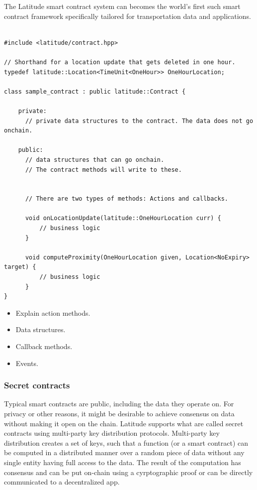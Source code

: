 The Latitude smart contract system can becomes the world's first such smart contract framework specifically tailored for
transportation data and applications.

\lstset{language=C++,basicstyle=\small}

\begin{lstlisting}[float, caption=Structure of a Latitude Smart Contract, frame=lines]

#include <latitude/contract.hpp>

// Shorthand for a location update that gets deleted in one hour.
typedef latitude::Location<TimeUnit<OneHour>> OneHourLocation;

class sample_contract : public latitude::Contract {

    private:
      // private data structures to the contract. The data does not go onchain.

    public:
      // data structures that can go onchain.
      // The contract methods will write to these.


      // There are two types of methods: Actions and callbacks.

      void onLocationUpdate(latitude::OneHourLocation curr) {
          // business logic
      }

      void computeProximity(OneHourLocation given, Location<NoExpiry> target) {
          // business logic
      }
}
\end{lstlisting}

\begin{itemize}

    \item Explain action methods.
    \item Data structures.
    \item Callback methods.
    \item Events.

\end{itemize}

\subsubsection{Secret contracts}

Typical smart contracts are public, including the data they operate on. For privacy or other reasons, it might be
desirable to achieve consensus on data without making it open on the chain. Latitude supports what are called secret
contracts using multi-party key distribution protocols. Multi-party key distribution creates a set of keys, such that a
function (or a smart contract) can be computed in a distributed manner over a random piece of data without any single
entity having full access to the data. The result of the computation has consensus and can be put on-chain using a
cyrptographic proof or can be directly communicated to a decentralized  app.

